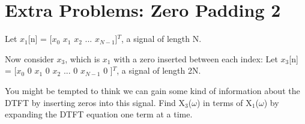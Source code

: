 \documentclass[11pt]{article}
\begin{document}
\vspace{4mm}

\section{Extra Problems: Zero Padding 2}

Let $x_1$[n] = [$x_0$ $x_1$ $x_2$ ... $x_{N-1}$]$^{T}$, a signal of length N.\newline

Now consider $x_3$, which is $x_1$ with a zero inserted between each index: \newline
Let $x_3$[n] = [$x_0$ 0 $x_1$ 0 $x_2$ ... 0 $x_{N-1}$ 0 ]$^{T}$, a signal of length 2N.\newline

You might be tempted to think we can gain some kind of information about the DTFT by inserting zeros into this signal. Find X$_3$($\omega$) in terms of X$_1$($\omega$) by expanding the DTFT equation one term at a time.
\end{document}
